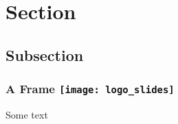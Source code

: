 \documentclass{beamer}
\newcommand\frametitlelogo[1]{\frametitle{#1\hspace{0pt plus 1 filll} \texttt{[image: logo\_slides]}}}
\begin{document}
\section{Section}
\subsection{Subsection}

\begin{frame}[fragile]
  \frametitlelogo{A Frame}
  Some text

\end{frame}

\end{document}
